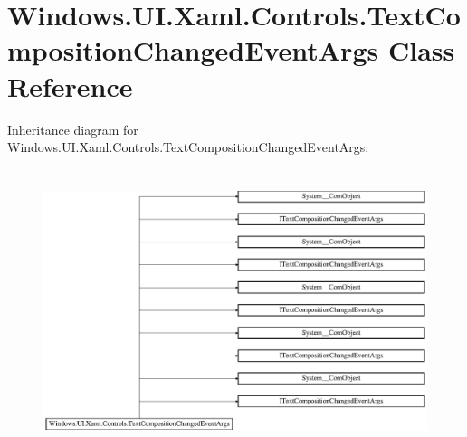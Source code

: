 \hypertarget{class_windows_1_1_u_i_1_1_xaml_1_1_controls_1_1_text_composition_changed_event_args}{}\section{Windows.\+U\+I.\+Xaml.\+Controls.\+Text\+Composition\+Changed\+Event\+Args Class Reference}
\label{class_windows_1_1_u_i_1_1_xaml_1_1_controls_1_1_text_composition_changed_event_args}
Inheritance diagram for Windows.\+U\+I.\+Xaml.\+Controls.\+Text\+Composition\+Changed\+Event\+Args\+:\begin{figure}[H]
\begin{center}
\leavevmode
\includegraphics[height=8.257373cm]{class_windows_1_1_u_i_1_1_xaml_1_1_controls_1_1_text_composition_changed_event_args}
\end{center}
\end{figure}
